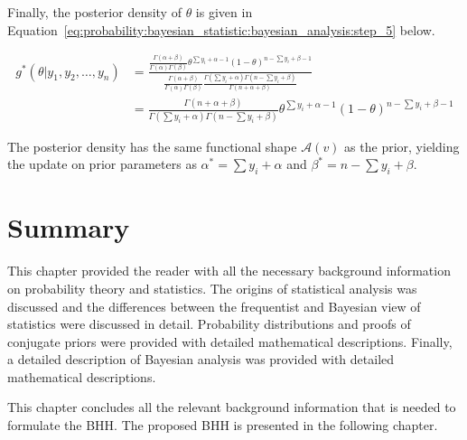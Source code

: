 \noindent
Finally, the posterior density of $\theta$ is given in Equation~\eqref{eq:probability:bayesian_statistic:bayesian_analysis:step_5} below.

\begin{equation}
      \label{eq:probability:bayesian_statistic:bayesian_analysis:step_5}
      \begin{split}
            g^{*}(\theta \vert y_{1}, y_{2}, \dots, y_{n})
            &= \frac{\frac{\Gamma(\alpha + \beta)}{\Gamma(\alpha)\Gamma(\beta)}\theta^{\sum y_{i} + \alpha - 1}(1-\theta)^{n - \sum y_{i} + \beta - 1}}{\frac{\Gamma(\alpha + \beta)}{\Gamma(\alpha)\Gamma(\beta)}\frac{\Gamma(\sum y_{i} + \alpha)\Gamma(n - \sum y_{i} + \beta)}{\Gamma(n + \alpha + \beta)}}\\
            &= \frac{\Gamma(n + \alpha + \beta)}{\Gamma(\sum y_{i} + \alpha)\Gamma(n - \sum y_{i} + \beta)}\theta^{\sum y_{i} + \alpha - 1}(1-\theta)^{n - \sum y_{i} + \beta - 1}
      \end{split}
\end{equation}

\noindent
The posterior density has the same functional shape $\mathcal{A}(v)$ as the prior, yielding the update on prior parameters as $\alpha^{*} = \sum y_{i} + \alpha$ and $\beta^{*} = n - \sum y_{i} + \beta$.


\section{Summary}\label{sec:probability:summary}

This chapter provided the reader with all the necessary background information on probability theory and statistics. The origins of statistical analysis was discussed and the differences between the frequentist and Bayesian view of statistics were discussed in detail. Probability distributions and proofs of conjugate priors were provided with detailed mathematical descriptions. Finally, a detailed description of Bayesian analysis was provided with detailed mathematical descriptions.

This chapter concludes all the relevant background information that is needed to formulate the \acs{BHH}. The proposed \acs{BHH} is presented in the following chapter.
